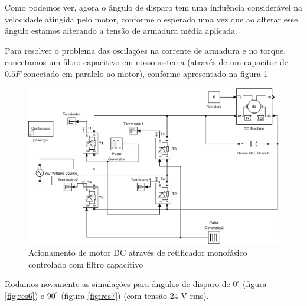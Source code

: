 \documentclass{article}
\begin{document}
Como podemos ver, agora o ângulo de disparo tem uma influência considerável na velocidade atingida pelo motor, conforme o esperado uma vez que ao alterar esse ângulo estamos alterando a tensão de armadura média aplicada.

Para resolver o problema das oscilações na corrente de armadura e no torque, conectamos um filtro capacitivo em nosso sistema (através de um capacitor de $0.5 F$ conectado em paralelo ao motor), conforme apresentado na figura \ref{fig:sim4} 

\begin{figure}[H]
	\centering
	\includegraphics[width=\linewidth]{matlab/sim4}
	\caption{Acionamento de motor DC através de retificador monofásico controlado com filtro capacitivo}
	\label{fig:sim4}
\end{figure}

Rodamos novamente as simulações para ângulos de disparo de $0^\circ$ (figura \ref{fig:res6}) e $90^\circ$ (figura \ref{fig:res7}) (com tensão 24 V rms).
\end{document}
